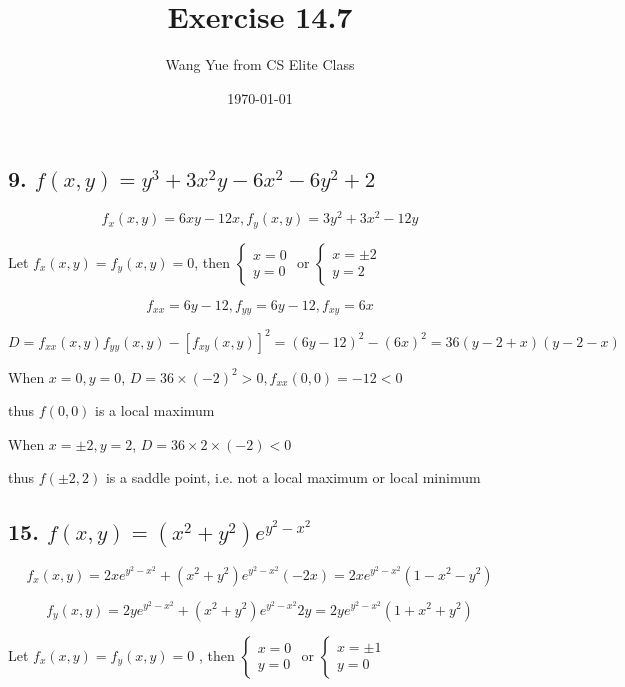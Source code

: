 \documentclass{article}
\begin{document}
  \title{Exercise 14.7}
  \author{Wang Yue from CS Elite Class}
  \date{\today}
  \maketitle

  \subsection*{9. $f(x, y) = y^3 + 3x^2y - 6x^2 -6y^2 + 2$}

  $$f_x(x, y) = 6xy - 12x, f_y(x, y) = 3y^2+3x^2-12y$$

  Let $f_x(x, y) = f_y(x, y) = 0$, then $\left\{ \begin{array}{ll} x = 0 \\ y = 0 \end{array}\right.$ or $\left\{ \begin{array}{ll} x = \pm 2 \\ y = 2 \end{array}\right.$

  $$f_{xx} = 6y - 12, f_{yy} = 6y - 12, f_{xy} = 6x$$

  $$D = f_{xx}(x, y)f_{yy}(x, y) - [f_{xy}(x, y)]^2 = (6y-12)^2 - (6x)^2 = 36(y-2+x)(y-2-x)$$

  When $x = 0, y = 0$, $D = 36 \times (-2)^2 > 0, f_{xx}(0, 0) = -12 < 0$
  
  thus $f(0, 0)$ is a local maximum

  When $x = \pm 2, y = 2$, $D = 36 \times 2 \times (-2) < 0$

  thus $f(\pm 2, 2)$ is a saddle point, i.e. not a local maximum or local minimum

  \subsection*{15. $f(x, y) = (x^2+y^2)e^{y^2-x^2}$}

  $$f_x(x, y) = 2xe^{y^2-x^2} + (x^2+y^2)e^{y^2-x^2}(-2x) = 2xe^{y^2-x^2}(1-x^2-y^2)$$

  $$f_y(x, y) = 2ye^{y^2-x^2} + (x^2+y^2)e^{y^2-x^2}2y = 2ye^{y^2-x^2}(1+x^2+y^2)$$

  Let $f_x(x, y) = f_y(x, y) = 0$ , then $\left\{ \begin{array}{ll} x = 0 \\ y = 0 \end{array}\right.$ or $\left\{ \begin{array}{ll} x = \pm 1 \\ y = 0 \end{array}\right.$
\end{document}
